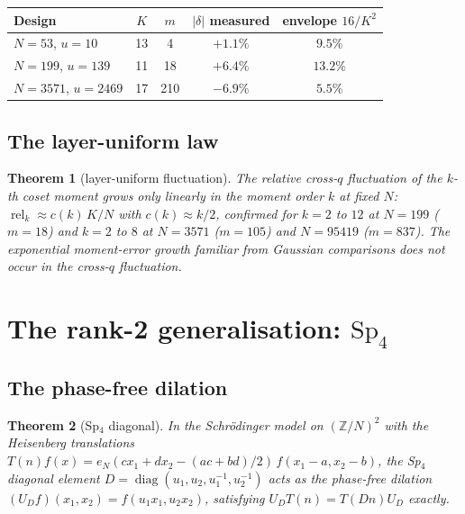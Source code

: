 \documentclass[11pt]{article}
\newtheorem{theorem}{Theorem}[section]
\begin{document}
\begin{center}
\begin{tabular}{lcccc}
\toprule
Design & $K$ & $m$ & $|\delta|$ measured & envelope $16/K^2$\\
\midrule
$N = 53$, $u = 10$ & 13 & 4 & $+1.1\%$ & $9.5\%$\\
$N = 199$, $u = 139$ & 11 & 18 & $+6.4\%$ & $13.2\%$\\
$N = 3571$, $u = 2469$ & 17 & 210 & $-6.9\%$ & $5.5\%$\\
\bottomrule
\end{tabular}
\end{center}

\subsection{The layer-uniform law}\label{sec:layers}

\begin{theorem}[layer-uniform fluctuation]\label{thm:layers}
The relative cross-$q$ fluctuation of the $k$-th coset moment grows
only linearly in the moment order $k$ at fixed $N$:
$\operatorname{rel}_k \approx c(k)\,K/N$ with $c(k) \approx k/2$,
confirmed for $k = 2$ to $12$ at $N = 199$ ($m = 18$) and $k = 2$ to
$8$ at $N = 3571$ ($m = 105$) and $N = 95419$ ($m = 837$).  The
exponential moment-error growth familiar from Gaussian comparisons
does not occur in the cross-$q$ fluctuation.
\end{theorem}

\section{The rank-2 generalisation: \texorpdfstring{$\mathrm{Sp}_4$}{Sp4}}
\label{sec:rank2}

\subsection{The phase-free dilation}

\begin{theorem}[Sp$_4$ diagonal]\label{thm:sp4dilation}
In the Schr\"odinger model on $(\mathbb{Z}/N)^2$ with the Heisenberg
translations $T(n)f(x) = e_N(c x_1 + d x_2 - (ac{+}bd)/2)\,
f(x_1{-}a, x_2{-}b)$, the Sp$_4$ diagonal element
$D = \operatorname{diag}(u_1, u_2, u_1^{-1}, u_2^{-1})$ acts as the
phase-free dilation $(U_D f)(x_1, x_2) = f(u_1 x_1, u_2 x_2)$,
satisfying $U_D T(n) = T(Dn) U_D$ exactly.
\end{theorem}
\end{document}

